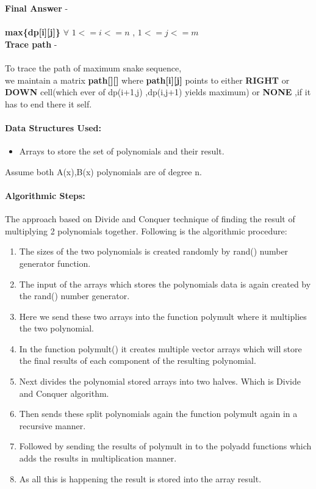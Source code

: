 \documentclass[10pt]{article}
\begin{document}
   \textbf{ Final Answer} -\\\\
                   \textbf{ max\{dp[i][j]\}} \(\forall\)   \(   1<=i<=n\) , \(1<=j<=m\)\\

  \textbf{Trace path} - \\\\
    To trace the path of maximum snake sequence,\\
    we maintain a matrix \textbf{path[][]}   where\textbf{ path[i][j]} points to either \textbf{RIGHT} or \textbf{DOWN} cell(which ever of dp(i+1,j) ,dp(i,j+1) yields maximum) or \textbf{NONE },if it has to end there it self.\\

\iffalse
\paragraph{Data Structures Used:}

\begin{itemize}

\item	Arrays to store the set of polynomials and their result.\\
\end{itemize}
Assume both A(x),B(x) polynomials are of degree n.



\paragraph{Algorithmic Steps:}

The approach based on Divide and Conquer technique of finding the result of multiplying 2 polynomials together. Following is the algorithmic procedure:
\begin{enumerate}

\item	The sizes of the two polynomials is created randomly by rand() number generator function.
\item	The input of the arrays which stores the polynomials data is again created by the rand() number generator.
\item	Here we send these two arrays into the function polymult where it multiplies the two polynomial.
\item	In the function polymult() it creates multiple vector arrays which will store the final results of each component of the resulting polynomial.
\item	Next divides the polynomial stored arrays into two halves. Which is Divide and Conquer algorithm.
\item	Then sends these split polynomials again the function polymult again in a recursive manner.
\item	 Followed by sending the results of polymult in to the polyadd functions which adds the results in multiplication manner.
\item As all this is happening the result is stored into the array result.
\end{enumerate}
\end{document}
